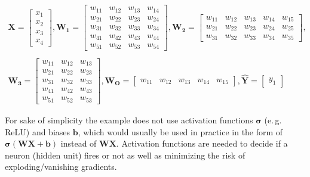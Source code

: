 \begin{equation} \label{eq:2}
\begin{gathered}
\mathbf{X} = \begin{bmatrix}
           x_{1} \\
           x_{2} \\
           x_{3} \\
           x_{4}
         \end{bmatrix},
\mathbf{W_1} = \begin{bmatrix}
           w_{11} & w_{12}& w_{13}& w_{14}\\
           w_{21} & w_{22}& w_{23}& w_{24} \\
           w_{31} & w_{32}& w_{33}& w_{34} \\
           w_{41} & w_{42}& w_{43}& w_{44} \\
           w_{51} & w_{52}& w_{53}& w_{54} 
         \end{bmatrix},
\mathbf{W_2} = \begin{bmatrix}
           w_{11} & w_{12}& w_{13}& w_{14}& w_{15}\\
           w_{21} & w_{22}& w_{23}& w_{24}& w_{25} \\
           w_{31} & w_{32}& w_{33}& w_{34}& w_{35} 
         \end{bmatrix},\\ \\
\mathbf{W_3} = \begin{bmatrix}
           w_{11} & w_{12}& w_{13}\\
           w_{21} & w_{22}& w_{23} \\
           w_{31} & w_{32}& w_{33} \\
           w_{41} & w_{42}& w_{43} \\
           w_{51} & w_{52}& w_{53} 
         \end{bmatrix},
\mathbf{W_O} = \begin{bmatrix} w_{11} & w_{12}& w_{13}& w_{14}& w_{15} \end{bmatrix},
\mathbf{\hat{Y}} = \begin{bmatrix} y_1 \end{bmatrix}
\end{gathered}
\end{equation}

For sake of simplicity the example does not use activation functions $\mathbf{\sigma}$ (e.\,g. ReLU) and biases $\mathbf{b}$, which would usually be used in practice in the form of $\mathbf{\sigma(WX+b)}$ instead of $\mathbf{WX}$.
Activation functions are needed to decide if a neuron (hidden unit) fires or not as well as minimizing the risk of exploding/vanishing gradients.


